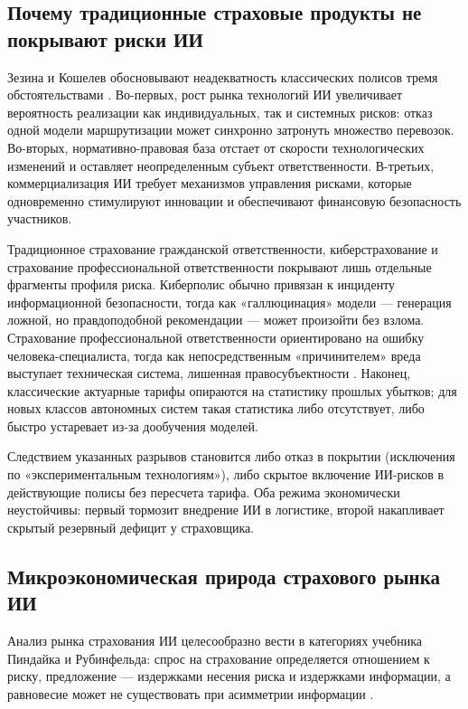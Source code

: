 \documentclass[a4paper,14pt]{extarticle}
\begin{document}
\subsection{Почему традиционные страховые продукты не покрывают риски ИИ}

Зезина и Кошелев обосновывают неадекватность классических полисов тремя обстоятельствами \cite{zezina}. Во-первых, рост рынка технологий ИИ увеличивает вероятность реализации как индивидуальных, так и системных рисков: отказ одной модели маршрутизации может синхронно затронуть множество перевозок. Во-вторых, нормативно-правовая база отстает от скорости технологических изменений и оставляет неопределенным субъект ответственности. В-третьих, коммерциализация ИИ требует механизмов управления рисками, которые одновременно стимулируют инновации и обеспечивают финансовую безопасность участников.

Традиционное страхование гражданской ответственности, киберстрахование и страхование профессиональной ответственности покрывают лишь отдельные фрагменты профиля риска. Киберполис обычно привязан к инциденту информационной безопасности, тогда как «галлюцинация» модели --- генерация ложной, но правдоподобной рекомендации --- может произойти без взлома. Страхование профессиональной ответственности ориентировано на ошибку человека-специалиста, тогда как непосредственным «причинителем» вреда выступает техническая система, лишенная правосубъектности \cite{zezina}. Наконец, классические актуарные тарифы опираются на статистику прошлых убытков; для новых классов автономных систем такая статистика либо отсутствует, либо быстро устаревает из-за дообучения моделей.

Следствием указанных разрывов становится либо отказ в покрытии (исключения по «экспериментальным технологиям»), либо скрытое включение ИИ-рисков в действующие полисы без пересчета тарифа. Оба режима экономически неустойчивы: первый тормозит внедрение ИИ в логистике, второй накапливает скрытый резервный дефицит у страховщика.

\subsection{Микроэкономическая природа страхового рынка ИИ}

Анализ рынка страхования ИИ целесообразно вести в категориях учебника Пиндайка и Рубинфельда: спрос на страхование определяется отношением к риску, предложение --- издержками несения риска и издержками информации, а равновесие может не существовать при асимметрии информации \cite{pindyck}.
\end{document}
